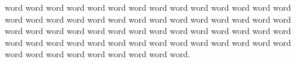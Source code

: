word word word word word word word word word word word word word word word word word word word word word word word word word word word word word word word word word word word word word word word word word word word word word word word word word word word word word word word word word word word word word word word word word.
